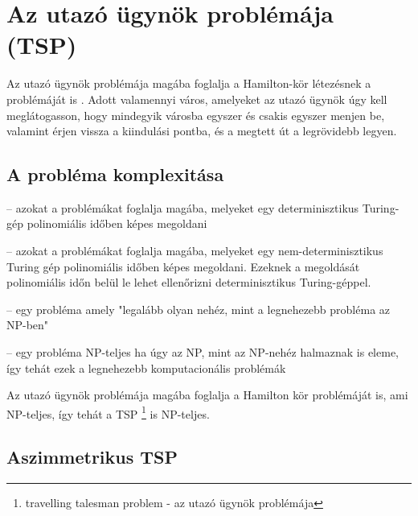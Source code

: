 \chapter{Az utazó ügynök problémája (TSP)}\label{ch:ALAP}


Az utazó ügynök problémája magába foglalja a Hamilton-kör létezésnek a problémáját is \cite{15}. Adott valamennyi város, amelyeket az utazó ügynök úgy kell meglátogasson, hogy mindegyik városba egyszer és csakis egyszer menjen be, valamint érjen vissza a kiindulási pontba, és a megtett út a legrövidebb legyen.

\section{A probléma komplexitása}\label{sec:ALAP:adatelem}

\begin{description}
	\setlength{\itemsep}{0.04mm}
	\item[P] -- azokat a problémákat foglalja magába, melyeket egy determinisztikus Turing-gép polinomiális időben képes megoldani
	\item[NP] -- azokat a problémákat foglalja magába, melyeket egy nem-determinisztikus Turing gép polinomiális időben képes megoldani. Ezeknek a megoldását polinomiális időn belül le lehet ellenőrizni determinisztikus Turing-géppel.
	\item[NP-nehéz] -- egy probléma amely "legalább olyan nehéz, mint a legnehezebb probléma az NP-ben"
	\item[NP-teljes] -- egy probléma NP-teljes ha úgy az NP, mint az NP-nehéz halmaznak is eleme, így tehát ezek a legnehezebb komputacionális problémák
\end{description}


Az utazó ügynök problémája magába foglalja a Hamilton kör problémáját is, ami NP-teljes, így tehát a TSP%
\footnote{ %
	travelling talesman problem - az utazó ügynök problémája
}  %
 is NP-teljes.

\section{Aszimmetrikus TSP}\label{sec:ALAP:adatelem}

